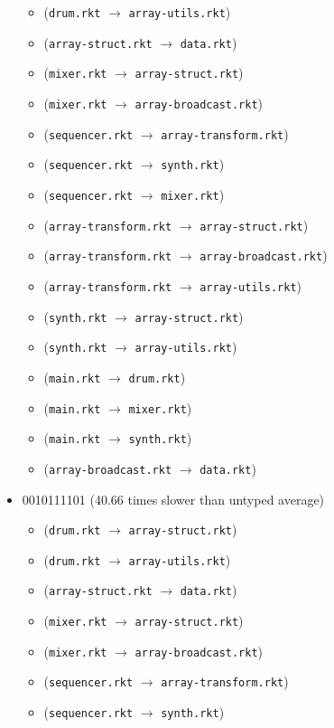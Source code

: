 \documentclass{article}
\newcommand{\mono}[1]{\texttt{#1}}
\begin{document}
\begin{itemize}
\begin{itemize}
  \item (\mono{drum.rkt} $\rightarrow$ \mono{array-utils.rkt})
  \item (\mono{array-struct.rkt} $\rightarrow$ \mono{data.rkt})
  \item (\mono{mixer.rkt} $\rightarrow$ \mono{array-struct.rkt})
  \item (\mono{mixer.rkt} $\rightarrow$ \mono{array-broadcast.rkt})
  \item (\mono{sequencer.rkt} $\rightarrow$ \mono{array-transform.rkt})
  \item (\mono{sequencer.rkt} $\rightarrow$ \mono{synth.rkt})
  \item (\mono{sequencer.rkt} $\rightarrow$ \mono{mixer.rkt})
  \item (\mono{array-transform.rkt} $\rightarrow$ \mono{array-struct.rkt})
  \item (\mono{array-transform.rkt} $\rightarrow$ \mono{array-broadcast.rkt})
  \item (\mono{array-transform.rkt} $\rightarrow$ \mono{array-utils.rkt})
  \item (\mono{synth.rkt} $\rightarrow$ \mono{array-struct.rkt})
  \item (\mono{synth.rkt} $\rightarrow$ \mono{array-utils.rkt})
  \item (\mono{main.rkt} $\rightarrow$ \mono{drum.rkt})
  \item (\mono{main.rkt} $\rightarrow$ \mono{mixer.rkt})
  \item (\mono{main.rkt} $\rightarrow$ \mono{synth.rkt})
  \item (\mono{array-broadcast.rkt} $\rightarrow$ \mono{data.rkt})
  \end{itemize}
\item 0010111101 (40.66 times slower than untyped average)
  \begin{itemize}
  \item (\mono{drum.rkt} $\rightarrow$ \mono{array-struct.rkt})
  \item (\mono{drum.rkt} $\rightarrow$ \mono{array-utils.rkt})
  \item (\mono{array-struct.rkt} $\rightarrow$ \mono{data.rkt})
  \item (\mono{mixer.rkt} $\rightarrow$ \mono{array-struct.rkt})
  \item (\mono{mixer.rkt} $\rightarrow$ \mono{array-broadcast.rkt})
  \item (\mono{sequencer.rkt} $\rightarrow$ \mono{array-transform.rkt})
  \item (\mono{sequencer.rkt} $\rightarrow$ \mono{synth.rkt})

\end{itemize}
\end{itemize}
\end{document}
